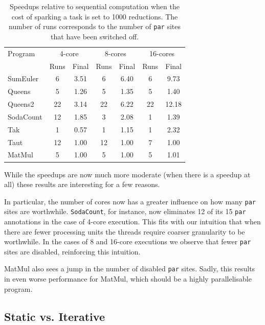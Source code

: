 \begin{table}[ht]
\caption[Profile-Directed Search with an overhead of $1000$ reductions]{Speedups relative to sequential computation when the cost of sparking
        a task is set to 1000 reductions. The number of runs corresponds to the
        number of \texttt{par} sites that have been switched off.}
\centering
\smallskip
  \begin{tabular}{  l||c c c c c c}
    Program & \multicolumn{2}{c}{4-core} & \multicolumn{2}{c}{8-cores} & \multicolumn{2}{c}{16-cores} \\
            & Runs & Final     & Runs & Final      & Runs & Final \\
    \hline
    SumEuler  & 6    & 3.51      & 6    & 6.40       & 6    & 9.73     \\
    Queens    & 5    & 1.26      & 5    & 1.35       & 5    & 1.40  \\
    Queens2   & 22   & 3.14      & 22   & 6.22       & 22   & 12.18  \\
    SodaCount & 12   & 1.85      & 3    & 2.08       & 1    & 1.39    \\
    Tak       & 1    & 0.57      & 1    & 1.15       & 1    & 2.32   \\
    Taut      & 12   & 1.00      & 12   & 1.00       & 7    & 1.00  \\
    MatMul    & 5    & 1.00      & 5    & 1.00       & 5    & 1.01   \\
  \end{tabular}
\label{table1000}
\end{table}

While the speedups are now much more moderate (when there is a speedup at all)
these results are interesting for a few reasons.

In particular, the number of cores now has a greater influence on how many
\verb-par- sites are worthwhile.  \texttt{SodaCount}, for instance, now eliminates 12 of
its 15 \verb-par- annotations in the case of 4-core execution. This fits with
our intuition that when there are fewer processing units the threads require
coarser granularity to be worthwhile. In the cases of 8 and 16-core executions
we observe that fewer \verb-par- sites are disabled, reinforcing this
intuition.

MatMul also sees a jump in the number of disabled \verb-par- sites. Sadly, this
results in even worse performance for MatMul, which should be a highly
parallelisable program.

\subsection*{Static vs. Iterative}

